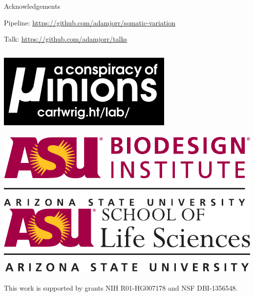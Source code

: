 \documentclass{beamer}
\begin{document}
\begin{frame}{Acknowledgements}

Pipeline:  \url{https://github.com/adamjorr/somatic-variation}

Talk:  \url{https://github.com/adamjorr/talks}

\vfill

\begin{columns}
	\includegraphics[width=.9\linewidth]{lab_logo.pdf}
	\\~\\
	\includegraphics[width=.9\linewidth]{biodesign_logo.pdf}
	\includegraphics[width=.9\linewidth]{sols_logo.pdf}
	\\~\\
	This work is supported by grants NIH R01-HG007178 and NSF DBI-1356548.
\end{columns}

\end{frame}
\end{document}
